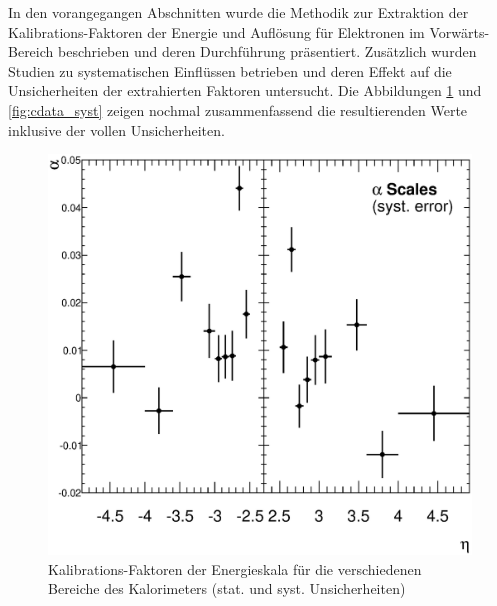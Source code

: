 In den vorangegangen Abschnitten wurde die Methodik zur Extraktion der
Kalibrations-Faktoren der Energie und Auflösung für Elektronen im
Vorwärts-Bereich beschrieben und deren Durchführung präsentiert. Zusätzlich
wurden Studien zu systematischen Einflüssen betrieben und deren Effekt auf die
Unsicherheiten der extrahierten Faktoren untersucht. Die Abbildungen
\ref{fig:alpha_syst} und \ref{fig:cdata_syst} zeigen nochmal zusammenfassend
die resultierenden Werte inklusive der vollen Unsicherheiten.

\begin{figure}
    \begin{minipage}{0.48\textwidth}
        \centering
        \includegraphics[width=1.\textwidth]{plots/alpha_syst}
        \captionsetup{format=plain}
        \caption{Kalibrations-Faktoren der Energieskala für die verschiedenen
            Bereiche des Kalorimeters (stat. und syst. Unsicherheiten)}
        \label{fig:alpha_syst}
    \end{minipage}
    \hfill
    \begin{minipage}{0.48\textwidth}
        \centering

\end{minipage}
\end{figure}
